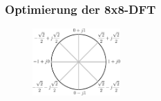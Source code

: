 \begin{frame}\frametitle{Optimierung der 8x8-DFT}
\vspace{0.3cm}
   \begin{figure}[!h]
  \centering
  \includegraphics[width=0.3\textwidth]{img/Einheitskreis-crop.pdf}
\end{figure}

\vspace{-0.3cm}
\begin{center}
 \begin{minipage}{0.9\textwidth}
\begingroup


\end{minipage}
\end{center}
\end{frame}

